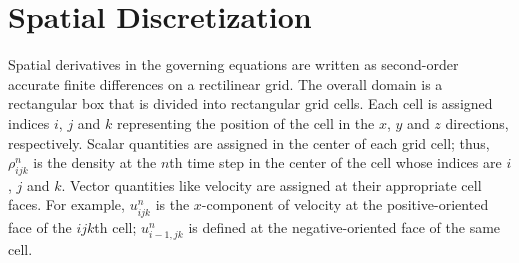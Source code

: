 \section{Spatial Discretization}

Spatial derivatives in the governing equations are written as second-order accurate
finite differences on a rectilinear grid. The overall
domain is a rectangular box that is divided into rectangular grid cells.
Each cell is assigned indices $i$, $j$ and $k$ representing the
position of the cell in the $x$, $y$ and $z$ directions, respectively.
Scalar quantities are assigned in the center of each grid cell; thus,
$\rho_{ijk}^n$ is the density at the $n$th time step in the center
of the cell whose indices are $i$, $j$ and $k$. Vector quantities like
velocity are assigned at their appropriate cell faces. For example,
$u_{ijk}^n$ is the $x$-component of velocity at the
positive-oriented face of the $ijk$th cell; $u_{i-1,jk}^n$ is defined at the
negative-oriented face of the same cell.


